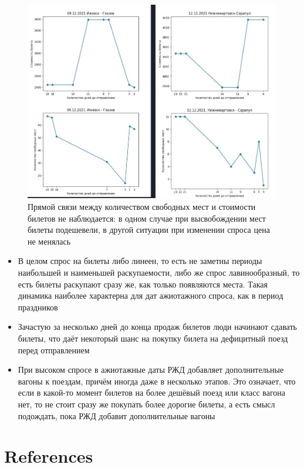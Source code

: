 \documentclass[conference]{IEEEtran}
\begin{document}
\begin{figure}
	\includegraphics[scale=0.4]{4pict}
	\caption{Прямой связи между количеством свободных мест и стоимости билетов не наблюдается: в одном случае при высвобождении мест билеты подешевели, в другой ситуации при изменении спроса цена не менялась}
\end{figure}

\begin{itemize}
	\item В целом спрос на билеты либо линеен, то есть не заметны периоды наибольшей и наименьшей раскупаемости, либо же спрос лавинообразный, то есть билеты раскупают сразу же, как только появляются места. Такая динамика наиболее характерна для дат ажиотажного спроса, как в период праздников
	
	\item Зачастую за несколько дней до конца продаж билетов люди начинают сдавать билеты, что даёт некоторый шанс на покупку билета на дефицитный поезд перед отправлением
	
	\item При высоком спросе в ажиотажные даты РЖД добавляет дополнительные вагоны к поездам, причём иногда даже в несколько этапов. Это означает, что если в какой-то момент билетов на более дешёвый поезд или класс вагона нет, то не стоит сразу же покупать более дорогие билеты, а есть смысл подождать, пока РЖД добавит дополнительные вагоны
\end{itemize}
\section*{References}
\end{document}
